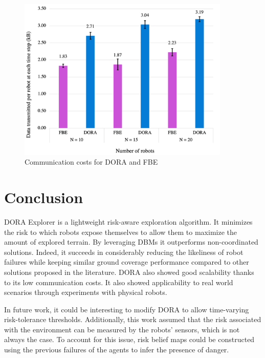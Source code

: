 \begin{figure}[htbp]
    \centering
    \includegraphics[width=0.9\textwidth]{figures/dora_explorer/communication.png}
    \caption[DORA communication costs]{Communication costs for \ac{DORA} and \ac{FBE}}
    \label{results:communicationCosts}
\end{figure}

\FloatBarrier

\section{Conclusion}
\ac{DORA} Explorer is a lightweight risk-aware exploration algorithm. It minimizes the risk to which robots expose themselves to allow them to maximize the amount of explored terrain. By leveraging \ac{DBM}s it outperforms non-coordinated solutions. Indeed, it succeeds in considerably reducing the likeliness of robot failures while keeping similar ground coverage performance compared to other solutions proposed in the literature. \ac{DORA} also showed good scalability thanks to its low communication costs. It also showed applicability to real world scenarios through experiments with physical robots.

In future work, it could be interesting to modify \ac{DORA} to allow time-varying risk-tolerance thresholds. Additionally, this work assumed that the risk associated with the environment can be measured by the robots' sensors, which is not always the case. To account for this issue, risk belief maps could be constructed using the previous failures of the agents to infer the presence of danger.
